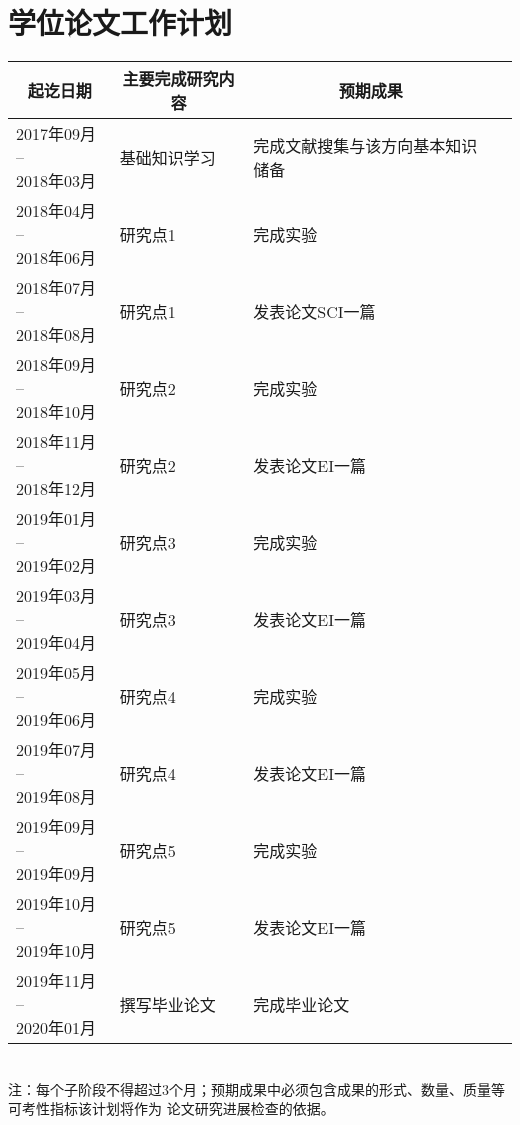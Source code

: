 



\section{学位论文工作计划}
{
\noindent
\begin{tabular*}{0.999\textwidth}{| p{ } <{\centering} | p{}  | p{} | p{}  |}

	\hline 
	\multicolumn{1}{|c|}{起讫日期} & 	\multicolumn{1}{c}{主要完成研究内容} & 	\multicolumn{1}{|c|}{预期成果} \\
	\hline 
	\tabincell{c}{2017年09月 -- \\2018年03月}   &  基础知识学习 &   完成文献搜集与该方向基本知识储备 \\ 
	\hline 
	\tabincell{c}{2018年04月 -- \\2018年06月} &  研究点1 &   完成实验 \\ 
	\hline 
	\tabincell{c}{2018年07月 -- \\2018年08月} &  研究点1 &   发表论文SCI一篇 \\ 
	\hline 
	\tabincell{c}{2018年09月 -- \\2018年10月} &  研究点2 &   完成实验 \\ 
	\hline 
    \tabincell{c}{2018年11月 -- \\2018年12月} &  研究点2 &   发表论文EI一篇 \\ 
    \hline 
    \tabincell{c}{2019年01月 -- \\2019年02月} &  研究点3 &   完成实验 \\ 
    \hline 
    \tabincell{c}{2019年03月 -- \\2019年04月} &  研究点3 &   发表论文EI一篇 \\ 
    \hline 
    \tabincell{c}{2019年05月 -- \\2019年06月} &  研究点4 &   完成实验 \\ 
    \hline 
    \tabincell{c}{2019年07月 -- \\2019年08月} &  研究点4 &   发表论文EI一篇 \\ 
    \hline 
    \tabincell{c}{2019年09月 -- \\2019年09月} &  研究点5 &   完成实验 \\ 
    \hline 
    \tabincell{c}{2019年10月 -- \\2019年10月} &  研究点5 &   发表论文EI一篇 \\ 
    \hline 
	\tabincell{c}{2019年11月 -- \\2020年01月} &  撰写毕业论文 &  完成毕业论文 \\ 
	\hline 
\end{tabular*} 
\\[1 cm]
{\songti 注：每个子阶段不得超过3个月；预期成果中必须包含成果的形式、数量、质量等可考性指标该计划将作为
论文研究进展检查的依据。}
\indent
}


